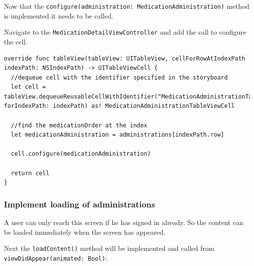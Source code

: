 \documentclass{article}
\begin{document}
Now that the
\texttt{configure(administration:\ MedicationAdministration)} method is
implemented it needs to be called.

Navigate to the \texttt{MedicationDetailViewController} and add the call
to configure the cell.

\begin{verbatim}
override func tableView(tableView: UITableView, cellForRowAtIndexPath indexPath: NSIndexPath) -> UITableViewCell {
  //dequeue cell with the identifier specified in the storyboard
  let cell = tableView.dequeueReusableCellWithIdentifier("MedicationAdministrationTableViewCell", forIndexPath: indexPath) as! MedicationAdministrationTableViewCell

  //find the medicationOrder at the index
  let medicationAdministration = administrations[indexPath.row]

  cell.configure(medicationAdministration)

  return cell
}
\end{verbatim}

\subsubsection{Implement loading of
administrations}\label{implement-loading-of-administrations}
A user can only reach this screen if he has signed in already. So the
content can be loaded immediately when the screen has appeared.

Next the \texttt{loadContent()} method will be implemented and called
from \texttt{viewDidAppear(animated:\ Bool)}:
\end{document}
